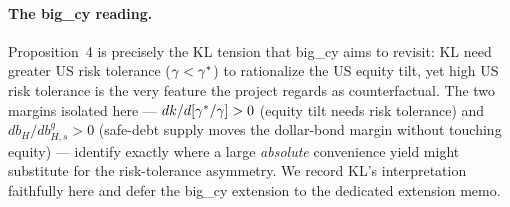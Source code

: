 \paragraph{The big\_cy reading.} Proposition~4 is precisely the KL tension that
big\_cy aims to revisit: KL need greater US risk tolerance ($\gamma<\gamma^{*}$) to
rationalize the US equity tilt, yet high US risk tolerance is the very feature the
project regards as counterfactual. The two margins isolated here ---
$dk/d[\gamma^{*}/\gamma]>0$ (equity tilt needs risk tolerance) and $db_H/db^g_{H,s}>0$
(safe-debt supply moves the dollar-bond margin without touching equity) ---
identify exactly where a large \emph{absolute} convenience yield might substitute
for the risk-tolerance asymmetry. We record KL's interpretation faithfully here
and defer the big\_cy extension to the dedicated extension memo.
